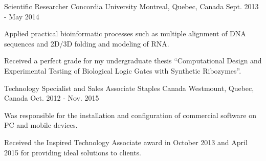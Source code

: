 \begin{cventries}
  \cventry
    {\small Scientific Researcher} %
    {\normalsize Concordia University} %
    {\small Montreal, Quebec, Canada} %
    {\small Sept. 2013 - May 2014} %
    {
      \begin{cvitems} %
      \item \small Applied practical bioinformatic processes such as multiple alignment of DNA sequences and 2D/3D folding and modeling of RNA.
      \item \small Received a perfect grade for my undergraduate thesis “Computational Design and Experimental Testing of Biological Logic Gates with Synthetic Ribozymes”.
      \end{cvitems}
    }

  \cventry
  {\small Technology Specialist and Sales Associate} %
  {\normalsize Staples Canada} %
    {\small Westmount, Quebec, Canada} %
    {\small Oct. 2012 - Nov. 2015} %
    {
      \begin{cvitems} %
      \item \small Was responsible for the installation and configuration of commercial software on PC and mobile devices.
      \item \small Received the Inspired Technology Associate award in October 2013 and April 2015 for providing ideal solutions to clients.
      \end{cvitems}
    }

\end{cventries}
